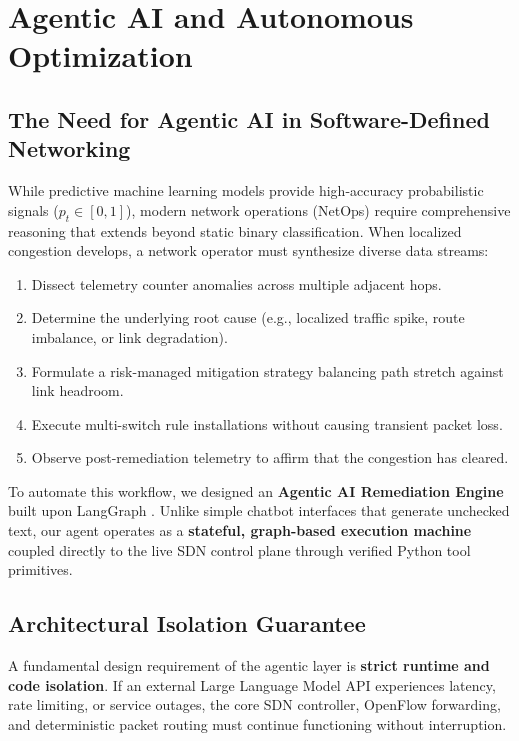 \chapter{Agentic AI and Autonomous Optimization}
\label{ch:agentic_ai}

\section{The Need for Agentic AI in Software-Defined Networking}
While predictive machine learning models provide high-accuracy probabilistic signals ($p_t \in [0, 1]$), modern network operations (NetOps) require comprehensive reasoning that extends beyond static binary classification. When localized congestion develops, a network operator must synthesize diverse data streams:
\begin{enumerate}
  \item Dissect telemetry counter anomalies across multiple adjacent hops.
  \item Determine the underlying root cause (e.g., localized traffic spike, route imbalance, or link degradation).
  \item Formulate a risk-managed mitigation strategy balancing path stretch against link headroom.
  \item Execute multi-switch rule installations without causing transient packet loss.
  \item Observe post-remediation telemetry to affirm that the congestion has cleared.
\end{enumerate}

To automate this workflow, we designed an \textbf{Agentic AI Remediation Engine} built upon LangGraph \cite{langgraph2024}. Unlike simple chatbot interfaces that generate unchecked text, our agent operates as a \textbf{stateful, graph-based execution machine} coupled directly to the live SDN control plane through verified Python tool primitives.

\section{Architectural Isolation Guarantee}
A fundamental design requirement of the agentic layer is \textbf{strict runtime and code isolation}. If an external Large Language Model API experiences latency, rate limiting, or service outages, the core SDN controller, OpenFlow forwarding, and deterministic packet routing must continue functioning without interruption.

